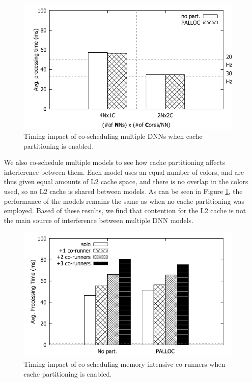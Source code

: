 \begin{figure}[h]
  \centering
  \includegraphics[width=.45\textwidth]{figs/palloc_multimodel}
  \caption{Timing impact of co-scheduling multiple DNNs when cache 
partitioning is enabled.}
  \label{fig:palloc_multimodel}
\end{figure}

We also co-schedule multiple models to see how cache partitioning affects
interference between them. Each model uses an equal number of colors, and
are thus given equal amounts of L2 cache space, and there is no overlap
in the colors used, so no L2 cache is shared between models. As can be 
seen in Figure \ref{fig:palloc_multimodel}, the performance of the models 
remains the same as when no cache partitioning was employed. Based of 
these results, we find that contention for the L2 cache is not the main
source of interference between multiple DNN models.

\begin{figure}[h]
  \centering
  \includegraphics[width=.45\textwidth]{figs/palloc_bandwidth_exectime}
  \caption{Timing impact of co-scheduling memory intensive co-runners 
when cache partitioning is enabled.}
  \label{fig:palloc_bandwidth_exectime}
\end{figure}

